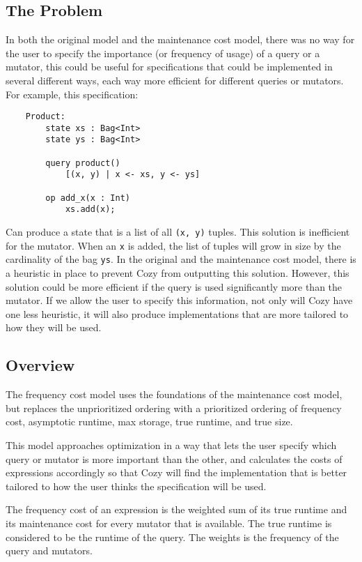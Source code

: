 \newcommand{\code}[1]{\texttt{#1}}

\subsection{The Problem}
In both the original model and the maintenance cost model, there was no way for
the user to specify the importance (or frequency of usage) of a query or a
mutator, this could be useful for specifications that could be implemented in
several different ways, each way more efficient for different queries or
mutators. For example, this specification:

\begin{lstlisting}
    Product:
        state xs : Bag<Int>
        state ys : Bag<Int>

        query product()
            [(x, y) | x <- xs, y <- ys]

        op add_x(x : Int)
            xs.add(x);
\end{lstlisting}

Can produce a state that is a list of all \code{(x, y)} tuples. This solution is
inefficient for the mutator. When an \code{x} is added, the list of tuples will
grow in size by the cardinality of the bag \code{ys}. In the original and the
maintenance cost model, there is a heuristic in place to prevent Cozy from
outputting this solution. However, this solution could be more efficient if the
query is used significantly more than the mutator. If we allow the user to
specify this information, not only will Cozy have one less heuristic, it will
also produce implementations that are more tailored to how they will be used.

\subsection{Overview}
The frequency cost model uses the foundations of the maintenance cost model, but
replaces the unprioritized ordering with a prioritized ordering of frequency
cost, asymptotic runtime, max storage, true runtime, and true size.

This model approaches optimization in a way that lets the user specify which
query or mutator is more important than the other, and calculates the costs of
expressions accordingly so that Cozy will find the implementation that is better
tailored to how the user thinks the specification will be used.

The frequency cost of an expression is the weighted sum of its true runtime and
its maintenance cost for every mutator that is available. The true runtime is
considered to be the runtime of the query. The weights is the frequency of the
query and mutators.

